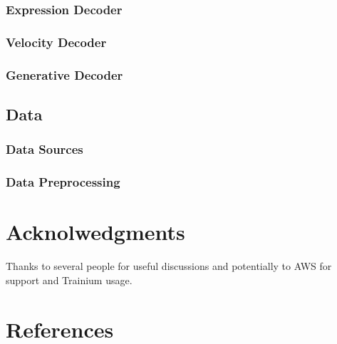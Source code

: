 \documentclass{article} %
\begin{document}
\subsubsection{Expression Decoder}

\subsubsection{Velocity Decoder}

\subsubsection{Generative Decoder}

  \subsection{Data}
  \subsubsection{Data Sources}
  \subsubsection{Data Preprocessing}

  \section{Acknolwedgments}
  Thanks to several people for useful discussions and potentially to AWS for support and Trainium usage.
 \section{References}


\end{document}

